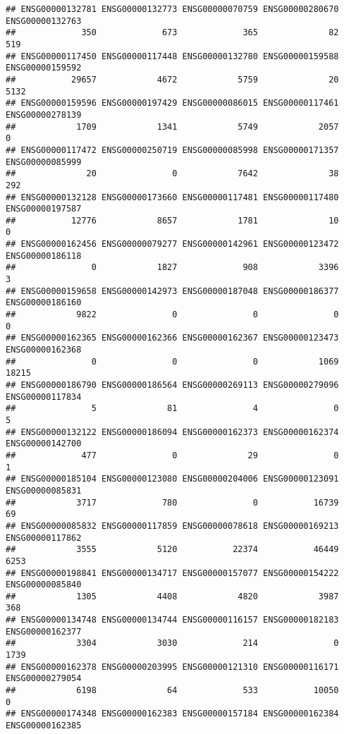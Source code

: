 \documentclass[
]{article}
\begin{document}
\begin{verbatim}
## ENSG00000132781 ENSG00000132773 ENSG00000070759 ENSG00000280670 ENSG00000132763 
##             350             673             365              82             519 
## ENSG00000117450 ENSG00000117448 ENSG00000132780 ENSG00000159588 ENSG00000159592 
##           29657            4672            5759              20            5132 
## ENSG00000159596 ENSG00000197429 ENSG00000086015 ENSG00000117461 ENSG00000278139 
##            1709            1341            5749            2057               0 
## ENSG00000117472 ENSG00000250719 ENSG00000085998 ENSG00000171357 ENSG00000085999 
##              20               0            7642              38             292 
## ENSG00000132128 ENSG00000173660 ENSG00000117481 ENSG00000117480 ENSG00000197587 
##           12776            8657            1781              10               0 
## ENSG00000162456 ENSG00000079277 ENSG00000142961 ENSG00000123472 ENSG00000186118 
##               0            1827             908            3396               3 
## ENSG00000159658 ENSG00000142973 ENSG00000187048 ENSG00000186377 ENSG00000186160 
##            9822               0               0               0               0 
## ENSG00000162365 ENSG00000162366 ENSG00000162367 ENSG00000123473 ENSG00000162368 
##               0               0               0            1069           18215 
## ENSG00000186790 ENSG00000186564 ENSG00000269113 ENSG00000279096 ENSG00000117834 
##               5              81               4               0               5 
## ENSG00000132122 ENSG00000186094 ENSG00000162373 ENSG00000162374 ENSG00000142700 
##             477               0              29               0               1 
## ENSG00000185104 ENSG00000123080 ENSG00000204006 ENSG00000123091 ENSG00000085831 
##            3717             780               0           16739              69 
## ENSG00000085832 ENSG00000117859 ENSG00000078618 ENSG00000169213 ENSG00000117862 
##            3555            5120           22374           46449            6253 
## ENSG00000198841 ENSG00000134717 ENSG00000157077 ENSG00000154222 ENSG00000085840 
##            1305            4408            4820            3987             368 
## ENSG00000134748 ENSG00000134744 ENSG00000116157 ENSG00000182183 ENSG00000162377 
##            3304            3030             214               0            1739 
## ENSG00000162378 ENSG00000203995 ENSG00000121310 ENSG00000116171 ENSG00000279054 
##            6198              64             533           10050               0 
## ENSG00000174348 ENSG00000162383 ENSG00000157184 ENSG00000162384 ENSG00000162385 

\end{verbatim}
\end{document}
